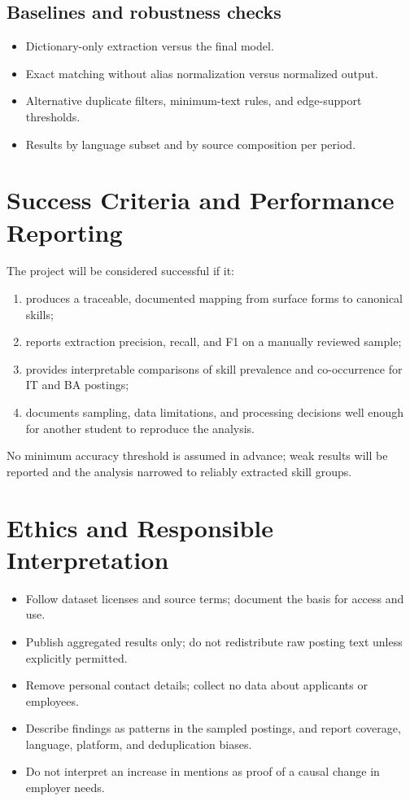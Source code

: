 \documentclass[12pt,a4paper]{article}
\begin{document}
\subsection{Baselines and robustness checks}
\begin{itemize}
  \item Dictionary-only extraction versus the final model.
  \item Exact matching without alias normalization versus normalized output.
  \item Alternative duplicate filters, minimum-text rules, and edge-support
        thresholds.
  \item Results by language subset and by source composition per period.
\end{itemize}

\section{Success Criteria and Performance Reporting}\label{sec:perf}
The project will be considered successful if it:
\begin{enumerate}
  \item produces a traceable, documented mapping from surface forms to
        canonical skills;
  \item reports extraction precision, recall, and F1 on a manually reviewed
        sample;
  \item provides interpretable comparisons of skill prevalence and
        co-occurrence for IT and BA postings;
  \item documents sampling, data limitations, and processing decisions well
        enough for another student to reproduce the analysis.
\end{enumerate}
No minimum accuracy threshold is assumed in advance; weak results will be
reported and the analysis narrowed to reliably extracted skill groups.

\section{Ethics and Responsible Interpretation}
\begin{itemize}
  \item Follow dataset licenses and source terms; document the basis for
        access and use.
  \item Publish aggregated results only; do not redistribute raw posting text
        unless explicitly permitted.
  \item Remove personal contact details; collect no data about applicants or
        employees.
  \item Describe findings as patterns in the sampled postings, and report
        coverage, language, platform, and deduplication biases.
  \item Do not interpret an increase in mentions as proof of a causal change
        in employer needs.
\end{itemize}
\end{document}
